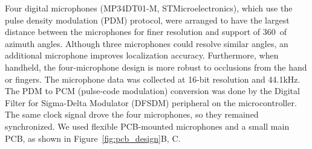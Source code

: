 Four digital microphones (MP34DT01-M, STMicroelectronics), which use the pulse density modulation (PDM) protocol, were arranged to have the largest distance between the microphones for finer resolution and support of 360\textdegree~of azimuth angles. Although three microphones could resolve similar angles, an additional microphone improves localization accuracy. Furthermore, when handheld, the four-microphone design is more robust to occlusions from the hand or fingers. The microphone data was collected at 16-bit resolution and 44.1kHz. The PDM to PCM (pulse-code modulation) conversion was done by the Digital Filter for Sigma-Delta Modulator (DFSDM) peripheral on the microcontroller. The same clock signal drove the four microphones, so they remained synchronized. We used flexible PCB-mounted microphones and a small main PCB, as shown in Figure~\ref{fig:pcb_design}B, C.






